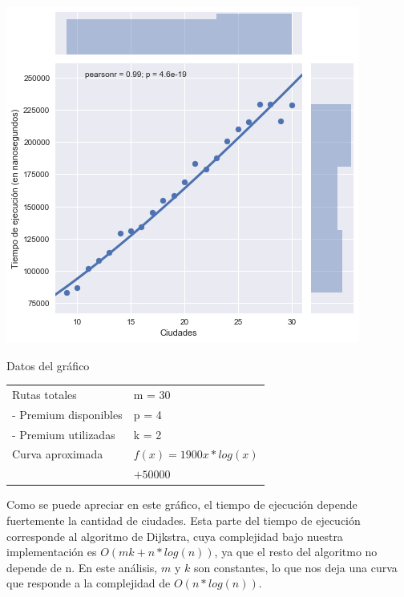 \noindent
\begin{minipage}{0.55\textwidth}
	\hfill
	\includegraphics[scale=0.6]{imagenes/ej1-1-fib.png}
\end{minipage}
\hfill
\begin{minipage}{0.44\textwidth}
	\begin{center}
		Datos del gráfico

		\begin{tabular}{ | l l |}
			\hline
			Rutas totales & m = 30 \\
			- Premium disponibles & p = 4 \\
			- Premium utilizadas & k = 2 \\ \hline
			Curva aproximada & $f(x) = 1900 x * log(x) $ \\
			& $+ 50000$ \\
			\hline
		\end{tabular}
	\end{center}
\end{minipage}

Como se puede apreciar en este gráfico, el tiempo de ejecución depende fuertemente la cantidad de ciudades. Esta parte del tiempo de ejecución corresponde al algoritmo de Dijkstra, cuya complejidad bajo nuestra implementación es $O(mk + n * log(n))$, ya que el resto del algoritmo no depende de n. En este análisis, $m$ y $k$ son constantes, lo que nos deja una curva que responde a la complejidad de $O(n * log(n))$.

